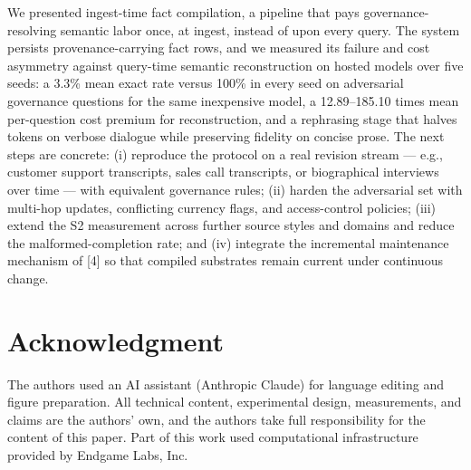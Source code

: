 \documentclass[conference,a4paper]{IEEEtran}
\begin{document}
We presented ingest-time fact compilation, a pipeline that pays governance-resolving semantic labor once, at ingest, instead of upon every query. The system persists provenance-carrying fact rows, and we measured its failure and cost asymmetry against query-time semantic reconstruction on hosted models over five seeds: a 3.3\% mean exact rate versus 100\% in every seed on adversarial governance questions for the same inexpensive model, a 12.89--185.10 times mean per-question cost premium for reconstruction, and a rephrasing stage that halves tokens on verbose dialogue while preserving fidelity on concise prose. The next steps are concrete: (i) reproduce the protocol on a real revision stream --- e.g., customer support transcripts, sales call transcripts, or biographical interviews over time --- with equivalent governance rules; (ii) harden the adversarial set with multi-hop updates, conflicting currency flags, and access-control policies; (iii) extend the S2 measurement across further source styles and domains and reduce the malformed-completion rate; and (iv) integrate the incremental maintenance mechanism of [4] so that compiled substrates remain current under continuous change.

\section*{Acknowledgment}

The authors used an AI assistant (Anthropic Claude) for language editing and figure preparation. All technical content, experimental design, measurements, and claims are the authors' own, and the authors take full responsibility for the content of this paper. Part of this work used computational infrastructure provided by Endgame Labs, Inc.
\end{document}
